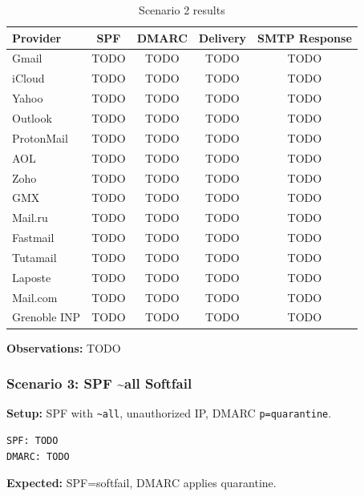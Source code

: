 \documentclass[11pt,a4paper]{article}
\begin{document}
\begin{table}[h]
\centering
\small
\begin{tabular}{lcccc}
\toprule
\textbf{Provider} & \textbf{SPF} & \textbf{DMARC} & \textbf{Delivery} & \textbf{SMTP Response} \\
\midrule
Gmail & TODO & TODO & TODO & TODO \\
iCloud & TODO & TODO & TODO & TODO \\
Yahoo & TODO & TODO & TODO & TODO \\
Outlook & TODO & TODO & TODO & TODO \\
ProtonMail & TODO & TODO & TODO & TODO \\
AOL & TODO & TODO & TODO & TODO \\
Zoho & TODO & TODO & TODO & TODO \\
GMX & TODO & TODO & TODO & TODO \\
Mail.ru & TODO & TODO & TODO & TODO \\
Fastmail & TODO & TODO & TODO & TODO \\
Tutamail & TODO & TODO & TODO & TODO \\
Laposte & TODO & TODO & TODO & TODO \\
Mail.com & TODO & TODO & TODO & TODO \\
Grenoble INP & TODO & TODO & TODO & TODO \\
\bottomrule
\end{tabular}
\caption{Scenario 2 results}
\end{table}

\textbf{Observations:} TODO


\subsubsection{Scenario 3: SPF \textasciitilde all Softfail}

\textbf{Setup:} SPF with \texttt{\textasciitilde all}, unauthorized IP, DMARC \texttt{p=quarantine}.

\begin{lstlisting}
SPF: TODO
DMARC: TODO
\end{lstlisting}

\textbf{Expected:} SPF=softfail, DMARC applies quarantine.
\end{document}
